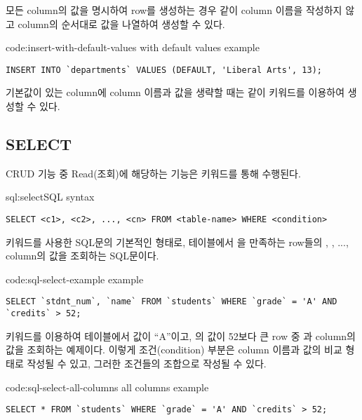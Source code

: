모든 column의 값을 명시하여 row를 생성하는 경우 \와 같이 column 이름을 작성하지 않고 column의 순서대로 값을 나열하여 생성할 수 있다.

\begin{code}{code:insert-with-default-values}{ with default values example}
\begin{verbatim}
INSERT INTO `departments` VALUES (DEFAULT, 'Liberal Arts', 13);
\end{verbatim}
\end{code}

기본값이 있는 column에 column 이름과 값을 생략할 때는 \와 같이  키워드를 이용하여 생성할 수 있다.
\clearpage

\subsection*{SELECT}

CRUD 기능 중 Read(조회)에 해당하는 기능은  키워드를 통해 수행된다.

\begin{sql}{sql:select}{SQL  syntax}
\begin{verbatim}
SELECT <c1>, <c2>, ..., <cn> FROM <table-name> WHERE <condition>
\end{verbatim}
\end{sql}

\는  키워드를 사용한 SQL문의 기본적인 형태로,  테이블에서 을 만족하는 row들의 , , ...,  column의 값을 조회하는 SQL문이다.

\begin{code}{code:sql-select-example}{ example}
\begin{verbatim}
SELECT `stdnt_num`, `name` FROM `students` WHERE `grade` = 'A' AND `credits` > 52;
\end{verbatim}
\end{code}

\은  키워드를 이용하여  테이블에서  값이 ``A''이고, 의 값이 52보다 큰 row 중 과  column의 값을 조회하는 예제이다. 이렇게 조건(condition) 부분은 column 이름과 값의 비교 형태로 작성될 수 있고, 그러한 조건들의 조합으로 작성될 수 있다.

\begin{code}{code:sql-select-all-columns}{ all columns example}
\begin{verbatim}
SELECT * FROM `students` WHERE `grade` = 'A' AND `credits` > 52;
\end{verbatim}
\end{code}


